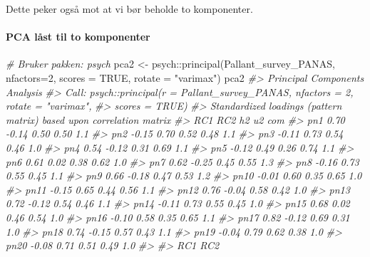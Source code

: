 \documentclass[
]{article}
\newenvironment{Shaded}{\begin{snugshade}}{\end{snugshade}}
\newcommand{\AttributeTok}[1]{\textcolor[rgb]{0.77,0.63,0.00}{#1}}
\newcommand{\CommentTok}[1]{\textcolor[rgb]{0.56,0.35,0.01}{\textit{#1}}}
\newcommand{\ConstantTok}[1]{\textcolor[rgb]{0.00,0.00,0.00}{#1}}
\newcommand{\DecValTok}[1]{\textcolor[rgb]{0.00,0.00,0.81}{#1}}
\newcommand{\FunctionTok}[1]{\textcolor[rgb]{0.00,0.00,0.00}{#1}}
\newcommand{\NormalTok}[1]{#1}
\newcommand{\OtherTok}[1]{\textcolor[rgb]{0.56,0.35,0.01}{#1}}
\newcommand{\SpecialCharTok}[1]{\textcolor[rgb]{0.00,0.00,0.00}{#1}}
\newcommand{\StringTok}[1]{\textcolor[rgb]{0.31,0.60,0.02}{#1}}
\begin{document}
Dette peker også mot at vi bør beholde to komponenter.

\hypertarget{pca-luxe5st-til-to-komponenter}{%
\paragraph{PCA låst til to komponenter}\label{pca-luxe5st-til-to-komponenter}}

\begin{Shaded}
\begin{Highlighting}[]
\CommentTok{\# Bruker pakken: psych}
\NormalTok{pca2 }\OtherTok{\textless{}{-}}\NormalTok{ psych}\SpecialCharTok{::}\FunctionTok{principal}\NormalTok{(Pallant\_survey\_PANAS, }\AttributeTok{nfactors=}\DecValTok{2}\NormalTok{, }\AttributeTok{scores =} \ConstantTok{TRUE}\NormalTok{, }\AttributeTok{rotate =} \StringTok{"varimax"}\NormalTok{)}
\NormalTok{pca2}
\CommentTok{\#\textgreater{} Principal Components Analysis}
\CommentTok{\#\textgreater{} Call: psych::principal(r = Pallant\_survey\_PANAS, nfactors = 2, rotate = "varimax", }
\CommentTok{\#\textgreater{}     scores = TRUE)}
\CommentTok{\#\textgreater{} Standardized loadings (pattern matrix) based upon correlation matrix}
\CommentTok{\#\textgreater{}        RC1   RC2   h2   u2 com}
\CommentTok{\#\textgreater{} pn1   0.70 {-}0.14 0.50 0.50 1.1}
\CommentTok{\#\textgreater{} pn2  {-}0.15  0.70 0.52 0.48 1.1}
\CommentTok{\#\textgreater{} pn3  {-}0.11  0.73 0.54 0.46 1.0}
\CommentTok{\#\textgreater{} pn4   0.54 {-}0.12 0.31 0.69 1.1}
\CommentTok{\#\textgreater{} pn5  {-}0.12  0.49 0.26 0.74 1.1}
\CommentTok{\#\textgreater{} pn6   0.61  0.02 0.38 0.62 1.0}
\CommentTok{\#\textgreater{} pn7   0.62 {-}0.25 0.45 0.55 1.3}
\CommentTok{\#\textgreater{} pn8  {-}0.16  0.73 0.55 0.45 1.1}
\CommentTok{\#\textgreater{} pn9   0.66 {-}0.18 0.47 0.53 1.2}
\CommentTok{\#\textgreater{} pn10 {-}0.01  0.60 0.35 0.65 1.0}
\CommentTok{\#\textgreater{} pn11 {-}0.15  0.65 0.44 0.56 1.1}
\CommentTok{\#\textgreater{} pn12  0.76 {-}0.04 0.58 0.42 1.0}
\CommentTok{\#\textgreater{} pn13  0.72 {-}0.12 0.54 0.46 1.1}
\CommentTok{\#\textgreater{} pn14 {-}0.11  0.73 0.55 0.45 1.0}
\CommentTok{\#\textgreater{} pn15  0.68  0.02 0.46 0.54 1.0}
\CommentTok{\#\textgreater{} pn16 {-}0.10  0.58 0.35 0.65 1.1}
\CommentTok{\#\textgreater{} pn17  0.82 {-}0.12 0.69 0.31 1.0}
\CommentTok{\#\textgreater{} pn18  0.74 {-}0.15 0.57 0.43 1.1}
\CommentTok{\#\textgreater{} pn19 {-}0.04  0.79 0.62 0.38 1.0}
\CommentTok{\#\textgreater{} pn20 {-}0.08  0.71 0.51 0.49 1.0}
\CommentTok{\#\textgreater{} }
\CommentTok{\#\textgreater{}                        RC1  RC2}

\end{Highlighting}
\end{Shaded}
\end{document}
